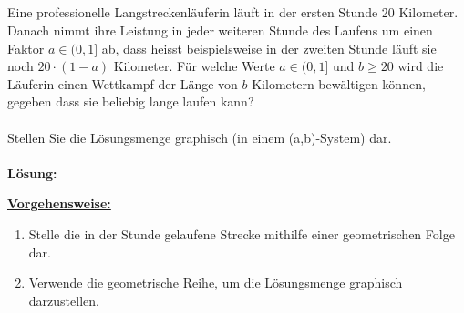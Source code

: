 \subsection*{}
Eine professionelle Langstreckenläuferin läuft in der ersten Stunde 20 Kilometer. Danach nimmt ihre Leistung in jeder weiteren Stunde des Laufens um einen Faktor $ a \in (0,1] $ ab, dass heisst beispielsweise in der zweiten Stunde läuft sie noch $ 20 \cdot (1-a) $ Kilometer.
Für welche Werte $ a \in (0,1] $ und $ b \geq 20  $ wird die Läuferin einen Wettkampf der Länge von $ b  $ Kilometern bewältigen können, gegeben dass sie beliebig lange laufen kann?
\\
\\
Stellen Sie die Lösungsmenge graphisch (in einem (a,b)-System) dar.
\\
\\
\textbf{Lösung:}
\begin{mdframed}
	\underline{\textbf{Vorgehensweise:}}
	\begin{enumerate}
		\item Stelle die in der Stunde gelaufene Strecke mithilfe einer geometrischen Folge dar.
		
		\item
		Verwende die geometrische Reihe, um die Lösungsmenge graphisch darzustellen.
	\end{enumerate}
\end{mdframed}

